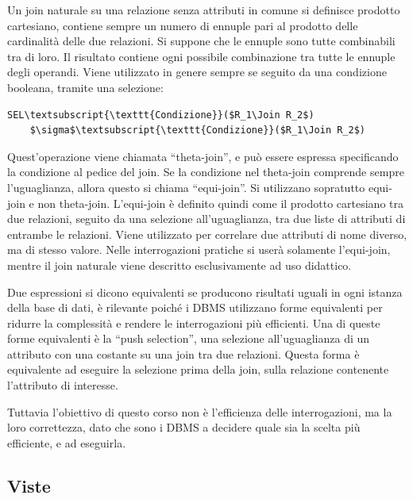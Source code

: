 \documentclass{article}
\numberwithin{equation}{subsection}
\begin{document}

Un join naturale su una relazione senza attributi in comune si definisce prodotto cartesiano, contiene sempre un numero di ennuple pari al prodotto delle cardinalità delle due relazioni. Si suppone che le ennuple 
sono tutte combinabili tra di loro. Il risultato contiene ogni possibile combinazione tra tutte le ennuple degli operandi. 
Viene utilizzato in genere sempre se seguito da una condizione booleana, tramite una selezione:
\begin{Verbatim}[commandchars=\\\{\}, codes={\catcode`$=3\catcode`_=8}]
    SEL\textsubscript{\texttt{Condizione}}($R_1\Join R_2$)
    $\sigma$\textsubscript{\texttt{Condizione}}($R_1\Join R_2$)
\end{Verbatim}
Quest'operazione viene chiamata ``theta-join'', e può essere espressa specificando la condizione al pedice del join. Se la condizione nel theta-join comprende sempre l'uguaglianza, allora questo si chiama 
``equi-join''. Si utilizzano sopratutto equi-join e non theta-join. L'equi-join è definito quindi come il prodotto cartesiano tra due relazioni, seguito da una selezione all'uguaglianza, tra due liste di attributi 
di entrambe le relazioni. Viene utilizzato per correlare due attributi di nome diverso, ma di stesso valore. 
Nelle interrogazioni pratiche si userà solamente l'equi-join, mentre il join naturale viene descritto esclusivamente ad uso didattico. 

Due espressioni si dicono equivalenti se producono risultati uguali in ogni istanza della base di dati, è rilevante poiché i DBMS utilizzano forme equivalenti per ridurre la complessità e rendere le interrogazioni 
più efficienti. 
Una di queste forme equivalenti è la ``push selection'', una selezione all'uguaglianza di un attributo con una costante su una join tra due relazioni. Questa forma è equivalente ad eseguire la selezione prima della 
join, sulla relazione contenente l'attributo di interesse. 

Tuttavia l'obiettivo di questo corso non è l'efficienza delle interrogazioni, ma la loro correttezza, dato che sono i DBMS a decidere quale sia la scelta più efficiente, e ad eseguirla. 

\subsection{Viste}
\end{document}
